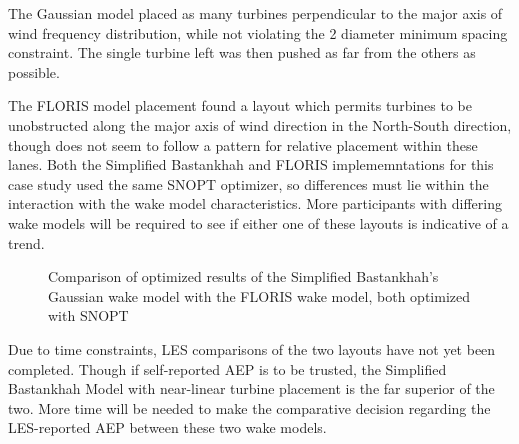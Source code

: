 \documentclass[]{aiaa-tc}
\begin{document}
The Gaussian model placed as many turbines perpendicular to the major axis of wind frequency distribution, while not violating the 2 diameter minimum spacing constraint. The single turbine left was then pushed as far from the others as possible.

The FLORIS model placement found a layout which permits turbines to be unobstructed along the major axis of wind direction in the North-South direction, though does not seem to follow a pattern for relative placement within these lanes. Both the Simplified Bastankhah and FLORIS implememntations for this case study used the same SNOPT optimizer, so differences must lie within the interaction with the wake model characteristics. More participants with differing wake models will be required to see if either one of these layouts is indicative of a trend.

\begin{figure}[H]%
	\centering
	\qquad
	\caption{Comparison of optimized results of the Simplified Bastankhah's Gaussian wake model with the FLORIS wake model, both optimized with SNOPT}
\end{figure}
Due to time constraints, LES comparisons of the two layouts have not yet been completed. Though if self-reported AEP is to be trusted, the Simplified Bastankhah Model with near-linear turbine placement is the far superior of the two. More time will be needed to make the comparative decision regarding the LES-reported AEP between these two wake models.
\end{document}
